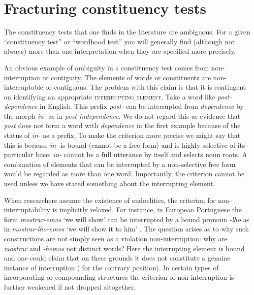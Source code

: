\documentclass[output=paper,hidelinks]{langscibook}
\begin{document}





\section{Fracturing constituency tests}
\label{sec:fracturing}

The constituency tests that one finds in the literature are ambiguous. For a given ``constituency test'' or ``wordhood test'' you will generally find (although not always) more than one interpretation when they are specified more precisely.

An obvious example of ambiguity in a constituency test comes from non-interruption or contiguity. The elements of words or constituents are non-inter\-rup\-table or contiguous. The problem with this claim is that it is contingent on identifying an appropriate \textsc{interrupting element}. Take a word like \textit{post-depen\-dence} in English. This prefix \textit{post-} can be interrupted from \textit{dependence} by the morph \textit{in-} as in \textit{post-independence}. We do not regard this as evidence that \textit{post} does not form a word with \textit{dependence} in the first example because of the status of \textit{in-} as a prefix. To make the criterion more precise we might say that this is because \textit{in-} is bound (cannot be a free form) and is highly selective of its particular base: \textit{in-} cannot be a full utterance by itself and selects noun roots. A combination of elements that can be interrupted by a non-selective free form would be regarded as more than one word. Importantly, the criterion cannot be used unless we have stated something about the interrupting element.

When researchers assume the existence of endoclitics, the criterion for non-interruptability is implicitly relaxed. For instance, in European Portuguese the form \textit{mostrar-emos} `we will show' can be interrupted by a bound pronoun \textit{-lho} as in \textit{mostrar-lho-emos} `we will show it to him' \citep{luis2004paradigm}. The question arises as to why such constructions are not simply seen as a violation non-interruption: why are \textit{mostrar} and \textit{-hemos} not distinct words? Here the interrupting element is bound and one could claim that on these grounds it does not constitute a genuine instance of interruption (\citealt{bauer2017compounds} for the contrary position). In certain types of incorporating or compounding structures the criterion of non-interruption is further weakened if not dropped altogether.
\end{document}
